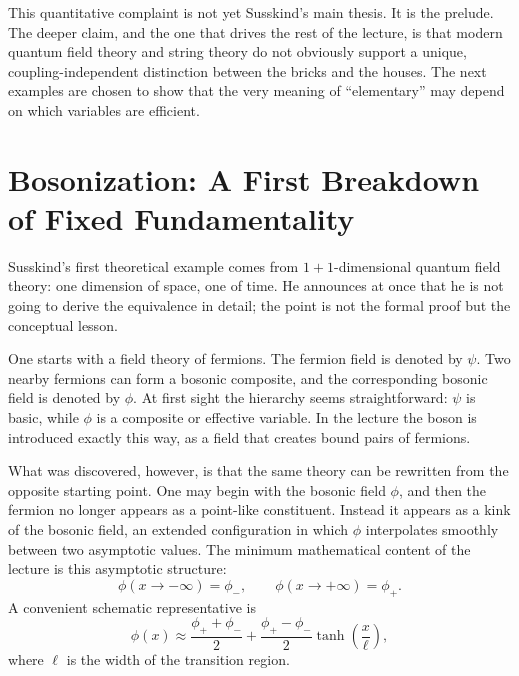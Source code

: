 This quantitative complaint is not yet Susskind's main thesis. It is the prelude. The deeper claim, and the one that drives the rest of the lecture, is that modern quantum field theory and string theory do not obviously support a unique, coupling-independent distinction between the bricks and the houses. The next examples are chosen to show that the very meaning of ``elementary'' may depend on which variables are efficient.

\section{Bosonization: A First Breakdown of Fixed Fundamentality}

Susskind's first theoretical example comes from \(1+1\)-dimensional quantum field theory: one dimension of space, one of time. He announces at once that he is not going to derive the equivalence in detail; the point is not the formal proof but the conceptual lesson.

One starts with a field theory of fermions. The fermion field is denoted by \(\psi\). Two nearby fermions can form a bosonic composite, and the corresponding bosonic field is denoted by \(\phi\). At first sight the hierarchy seems straightforward: \(\psi\) is basic, while \(\phi\) is a composite or effective variable. In the lecture the boson is introduced exactly this way, as a field that creates bound pairs of fermions.

What was discovered, however, is that the same theory can be rewritten from the opposite starting point. One may begin with the bosonic field \(\phi\), and then the fermion no longer appears as a point-like constituent. Instead it appears as a kink of the bosonic field, an extended configuration in which \(\phi\) interpolates smoothly between two asymptotic values. The minimum mathematical content of the lecture is this asymptotic structure:
\begin{equation}
\phi(x\to -\infty)=\phi_-,
\qquad
\phi(x\to +\infty)=\phi_+.
\end{equation}
A convenient schematic representative is
\begin{equation}
\phi(x)\approx \frac{\phi_++\phi_-}{2}
+
\frac{\phi_+-\phi_-}{2}\tanh\!\left(\frac{x}{\ell}\right),
\end{equation}
where \(\ell\) is the width of the transition region.


